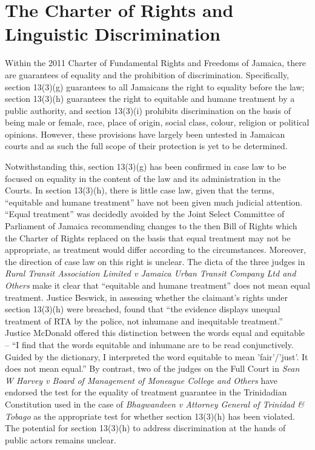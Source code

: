 \documentclass[output=paper,colorlinks,citecolor=brown]{langscibook}
\begin{document}
\section{The Charter of Rights and Linguistic Discrimination}

Within the 2011 Charter of Fundamental Rights and Freedoms of Jamaica, there are guarantees of equality and the prohibition of discrimination. Specifically, section 13(3)(g) guarantees to all Jamaicans the right to equality before the law; section 13(3)(h) guarantees the right to equitable and humane treatment by a public authority, and section 13(3)(i) prohibits discrimination on the basis of being male or female, race, place of origin, social class, colour, religion or political opinions. However, these provisions have largely been untested in Jamaican courts and as such the full scope of their protection is yet to be determined.

Notwithstanding this, section 13(3)(g) has been confirmed in case law to be focused on equality in the content of the law and its administration in the Courts. In section 13(3)(h), there is little case law, given that the terms, “equitable and humane treatment” have not been given much judicial attention. “Equal treatment” was decidedly avoided by the Joint Select Committee of Parliament of Jamaica recommending changes to the then Bill of Rights which the Charter of Rights replaced on the basis that equal treatment may not be appropriate, as treatment would differ according to the circumstances. Moreover, the direction of case law on this right is unclear. The dicta of the three judges in \textit{Rural Transit Association Limited v Jamaica Urban Transit Company Ltd and Others} make it clear that “equitable and humane treatment” does not mean equal treatment. Justice Beswick, in assessing whether the claimant’s rights under section 13(3)(h) were breached, found that “the evidence displays unequal treatment of RTA by the police, not inhumane and inequitable treatment.” Justice McDonald offered this distinction between the words equal and equitable -- “I find that the words equitable and inhumane are to be read conjunctively. Guided by the dictionary, I interpreted the word equitable to mean 'fair'/'just'. It does not mean equal.” By contrast, two of the judges on the Full Court in \textit{Sean W Harvey v Board of Management of Moneague College} \textit{and Others} have endorsed the test for the equality of treatment guarantee in the Trinidadian Constitution used in the case of \textit{Bhagwandeen v Attorney General of Trinidad \& Tobago} as the appropriate test for whether section 13(3)(h) has been violated. The potential for section 13(3)(h) to address discrimination at the hands of public actors remains unclear. 
\end{document}
